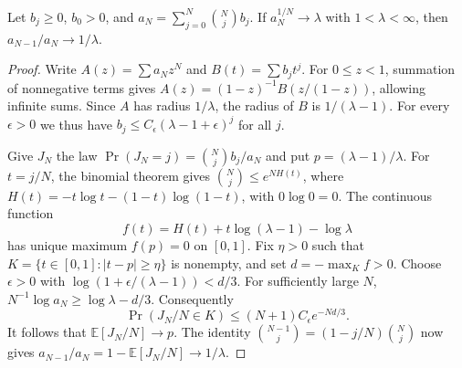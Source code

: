 \begin{lemma}\label{lem:binomial-smoothing}
Let \(b_j\geq 0\), \(b_0>0\), and
\(a_N=\sum_{j=0}^N\binom Nj b_j\).
If \(a_N^{1/N}\to\lambda\) with \(1<\lambda<\infty\), then
\(a_{N-1}/a_N\to 1/\lambda\).
\end{lemma}
\begin{proof}
Write \(A(z)=\sum a_Nz^N\) and \(B(t)=\sum b_jt^j\).
For \(0\leq z<1\), summation of nonnegative terms gives
\(A(z)=(1-z)^{-1}B(z/(1-z))\), allowing infinite sums.
Since \(A\) has radius \(1/\lambda\), the radius of \(B\) is
\(1/(\lambda-1)\). For every \(\epsilon>0\) we thus have
\(b_j\leq C_\epsilon(\lambda-1+\epsilon)^j\) for all \(j\).

Give \(J_N\) the law
\(\Pr(J_N=j)=\binom Nj b_j/a_N\) and put \(p=(\lambda-1)/\lambda\).
For \(t=j/N\), the binomial theorem gives \(\binom Nj\leq e^{NH(t)}\),
where \(H(t)=-t\log t-(1-t)\log(1-t)\), with \(0\log0=0\).
The continuous function
\[
 f(t)=H(t)+t\log(\lambda-1)-\log\lambda
\]
has unique maximum \(f(p)=0\) on \([0,1]\).
Fix \(\eta>0\) such that \(K=\{t\in[0,1]:|t-p|\geq\eta\}\) is
nonempty, and set \(d=-\max_{K}f>0\).
Choose \(\epsilon>0\) with
\(\log(1+\epsilon/(\lambda-1))<d/3\).
For sufficiently large \(N\),
\(N^{-1}\log a_N\geq\log\lambda-d/3\).
Consequently
\[
 \Pr(J_N/N\in K)\leq (N+1)C_\epsilon e^{-Nd/3}.
\]
It follows that \(\mathbb E[J_N/N]\to p\). The identity
\(\binom{N-1}{j}=(1-j/N)\binom Nj\) now gives
\(a_{N-1}/a_N=1-\mathbb E[J_N/N]\to1/\lambda\).
\end{proof}
